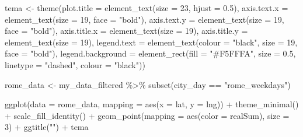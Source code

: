\documentclass[
]{article}
\newenvironment{Shaded}{\begin{snugshade}}{\end{snugshade}}
\newcommand{\AttributeTok}[1]{\textcolor[rgb]{0.77,0.63,0.00}{#1}}
\newcommand{\DecValTok}[1]{\textcolor[rgb]{0.00,0.00,0.81}{#1}}
\newcommand{\FloatTok}[1]{\textcolor[rgb]{0.00,0.00,0.81}{#1}}
\newcommand{\FunctionTok}[1]{\textcolor[rgb]{0.00,0.00,0.00}{#1}}
\newcommand{\NormalTok}[1]{#1}
\newcommand{\OtherTok}[1]{\textcolor[rgb]{0.56,0.35,0.01}{#1}}
\newcommand{\SpecialCharTok}[1]{\textcolor[rgb]{0.00,0.00,0.00}{#1}}
\newcommand{\StringTok}[1]{\textcolor[rgb]{0.31,0.60,0.02}{#1}}
\begin{document}
\begin{Shaded}
\begin{Highlighting}[]
\NormalTok{tema }\OtherTok{\textless{}{-}} \FunctionTok{theme}\NormalTok{(}\AttributeTok{plot.title =} \FunctionTok{element\_text}\NormalTok{(}\AttributeTok{size =} \DecValTok{23}\NormalTok{, }\AttributeTok{hjust =} \FloatTok{0.5}\NormalTok{),}
    \AttributeTok{axis.text.x =} \FunctionTok{element\_text}\NormalTok{(}\AttributeTok{size =} \DecValTok{19}\NormalTok{, }\AttributeTok{face =} \StringTok{"bold"}\NormalTok{), }\AttributeTok{axis.text.y =} \FunctionTok{element\_text}\NormalTok{(}\AttributeTok{size =} \DecValTok{19}\NormalTok{,}
        \AttributeTok{face =} \StringTok{"bold"}\NormalTok{), }\AttributeTok{axis.title.x =} \FunctionTok{element\_text}\NormalTok{(}\AttributeTok{size =} \DecValTok{19}\NormalTok{),}
    \AttributeTok{axis.title.y =} \FunctionTok{element\_text}\NormalTok{(}\AttributeTok{size =} \DecValTok{19}\NormalTok{), }\AttributeTok{legend.text =} \FunctionTok{element\_text}\NormalTok{(}\AttributeTok{colour =} \StringTok{"black"}\NormalTok{,}
        \AttributeTok{size =} \DecValTok{19}\NormalTok{, }\AttributeTok{face =} \StringTok{"bold"}\NormalTok{), }\AttributeTok{legend.background =} \FunctionTok{element\_rect}\NormalTok{(}\AttributeTok{fill =} \StringTok{"\#F5FFFA"}\NormalTok{,}
        \AttributeTok{size =} \FloatTok{0.5}\NormalTok{, }\AttributeTok{linetype =} \StringTok{"dashed"}\NormalTok{, }\AttributeTok{colour =} \StringTok{"black"}\NormalTok{))}

\NormalTok{rome\_data }\OtherTok{\textless{}{-}}\NormalTok{ my\_data\_filtered }\SpecialCharTok{\%\textgreater{}\%}
    \FunctionTok{subset}\NormalTok{(city\_day }\SpecialCharTok{==} \StringTok{"rome\_weekdays"}\NormalTok{)}

\FunctionTok{ggplot}\NormalTok{(}\AttributeTok{data =}\NormalTok{ rome\_data, }\AttributeTok{mapping =} \FunctionTok{aes}\NormalTok{(}\AttributeTok{x =}\NormalTok{ lat, }\AttributeTok{y =}\NormalTok{ lng)) }\SpecialCharTok{+} \FunctionTok{theme\_minimal}\NormalTok{() }\SpecialCharTok{+}
    \FunctionTok{scale\_fill\_identity}\NormalTok{() }\SpecialCharTok{+} \FunctionTok{geom\_point}\NormalTok{(}\AttributeTok{mapping =} \FunctionTok{aes}\NormalTok{(}\AttributeTok{color =}\NormalTok{ realSum),}
    \AttributeTok{size =} \DecValTok{3}\NormalTok{) }\SpecialCharTok{+} \FunctionTok{ggtitle}\NormalTok{(}\StringTok{""}\NormalTok{) }\SpecialCharTok{+}\NormalTok{ tema}
\end{Highlighting}
\end{Shaded}
\end{document}
